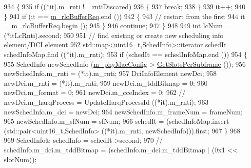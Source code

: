 \begin{DoxyCode}
{934                         \{
935                                 \textcolor{keywordflow}{if} ((*it).m\_rnti != rntiDiscared)
936                                 \{
937                                         \textcolor{keywordflow}{break};
938                                 \}
939                                 it++;
940                         \}
941                         \textcolor{keywordflow}{if} (it == \hyperlink{classns3_1_1MmWaveRrMacScheduler_a4808ca626b0b12682c3f1a079d016997}{m\_rlcBufferReq}.end ())
942                         \{
943                                 \textcolor{comment}{// restart from the first}
944                                 it = \hyperlink{classns3_1_1MmWaveRrMacScheduler_a4808ca626b0b12682c3f1a079d016997}{m\_rlcBufferReq}.begin ();
945                         \}
946                         \textcolor{keywordflow}{continue};
947                 \}
948 
949                 \textcolor{keywordtype}{int} lcNum = (*itLcRnti).second;
950 
951                 \textcolor{comment}{// find existing or create new scheduling info element/DCI element}
952                 std::map<uint16\_t,SchedInfo>::iterator schedIt = schedInfoMap.find ((*it).m\_rnti);
953                 \textcolor{keywordflow}{if} (schedIt == schedInfoMap.end ())
954                 \{
955                         SchedInfo newSchedInfo (\hyperlink{classns3_1_1MmWaveMacScheduler_a24d7af4971d2e500fe543cefbafa2fd9}{m\_phyMacConfig}->
      \hyperlink{classns3_1_1MmWavePhyMacCommon_a7b6552d2e0ffbeaf3bc2f9db6d0d6e63}{GetSlotsPerSubframe} ());
956                         newSchedInfo.m\_rnti = (*it).m\_rnti;
957                         DciInfoElement newDci;
958                         newDci.m\_rnti = (*it).m\_rnti;
959                         newDci.m\_tddBitmap = 0;
960                         newDci.m\_format = 0;
961                         newDci.m\_cceIndex = 0;
962                         \textcolor{comment}{//                              newDci.m\_harqProcess = UpdateHarqProcessId
       ((*it).m\_rnti);}
963                         newSchedInfo.m\_dci = newDci;
964                         newSchedInfo.m\_frameNum = frameNum;
965                         newSchedInfo.m\_sfNum = sfNum;
966                         schedIt = (schedInfoMap.insert (std::pair<uint16\_t,SchedInfo> ((*it).m\_rnti, 
      newSchedInfo))).first;
967                 \}
968 
969                 SchedInfo& schedInfo = schedIt->second;
970                 \textcolor{comment}{//                              schedInfo.m\_dci.m\_tddBitmap = (schedInfo.m\_dci.m\_tddBitmap
       | (0x1 << slotNum));}
}
\end{DoxyCode}
